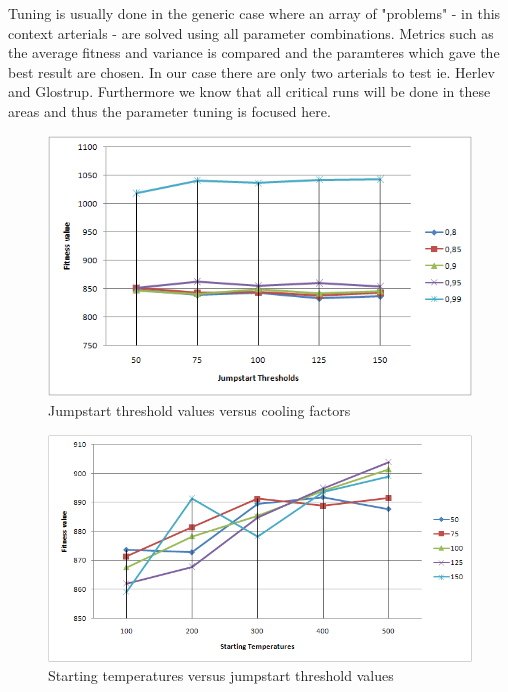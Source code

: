 Tuning is usually done in the generic case where an array of "problems" - in this context arterials - are solved using all parameter combinations. Metrics such as the average fitness and variance is compared and the paramteres which gave the best result are chosen. In our case there are only two arterials to test ie. Herlev and Glostrup. Furthermore we know that all critical runs will be done in these areas and thus the parameter tuning is focused here.

\begin{figure}[ht]
\centering
\includegraphics[scale=0.3]{tuning_jumpstart-vs-alpha.png}
\caption{Jumpstart threshold values versus cooling factors}
\label{fig:jumpstart-vs-alpha}
\end{figure}

\begin{figure}[ht]
\centering
\includegraphics[scale=0.3]{tuning_starttemp-vs-jumpstart.png}
\caption{Starting temperatures versus jumpstart threshold values}
\label{fig:starttemp-vs-jumpstart}
\end{figure}

